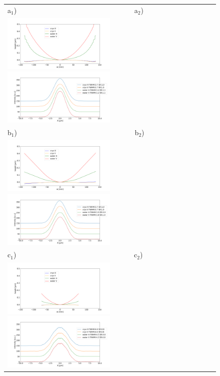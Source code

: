 \documentclass{iucr}              %
\begin{document}
   \begin{figure}
   \begin{center}
   \begin{tabular}{l} 
  a$_1$)~~~~~~~~~~~~~~~~~~~~~~~~~~~~~~~~~
  a$_2$)\\

    \includegraphics[width=0.5\textwidth]{figures/correctedprofiles.png}
    \includegraphics[width=0.5\textwidth]{figures/intensitycorrected.png} \\ 
  b$_1$)~~~~~~~~~~~~~~~~~~~~~~~~~~~~~~~~~
  b$_2$)\\
   \includegraphics[width=0.5\textwidth]{figures/correctedprofilesfitextrapolated.png}
   \includegraphics[width=0.5\textwidth]{figures/intensitycorrectedfit.png} \\   
  c$_1$)~~~~~~~~~~~~~~~~~~~~~~~~~~~~~~~~~
  c$_2$)\\
   \includegraphics[width=0.5\textwidth]{figures/correctedprofilesfit.png}
   \includegraphics[width=0.5\textwidth]{figures/intensitycorrectedfitcrop.png}\\


\end{tabular}
\end{center}
\end{figure}
\end{document}
